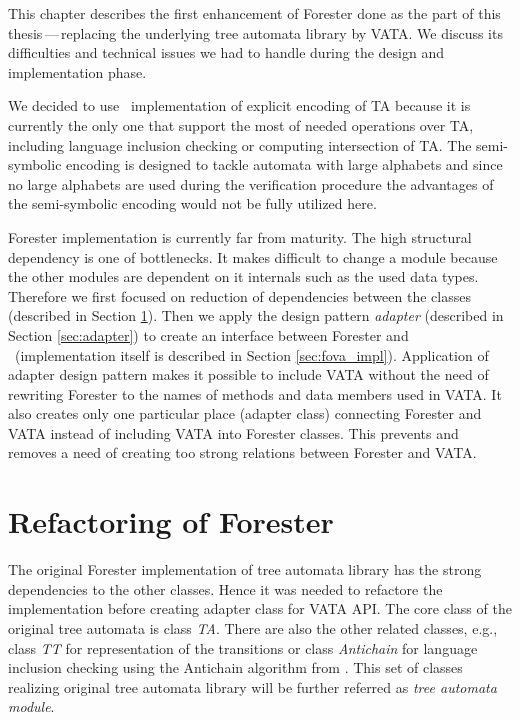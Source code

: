 This chapter describes the first enhancement of Forester done as the part of this thesis\,---\,replacing
the underlying tree automata library by VATA.
We discuss its difficulties and technical issues we had to handle during
the design and implementation phase.

We decided to use \vata\ implementation of explicit encoding of TA because
it is currently the only one that support the most of needed operations over TA,
including language inclusion checking or computing intersection of TA.
The semi-symbolic encoding is designed to tackle automata
with large alphabets
and since no large alphabets are used during the verification procedure
the advantages of the semi-symbolic encoding would not be fully utilized here.

Forester implementation is currently far from maturity.
The high structural dependency is one of bottlenecks.
It makes difficult to change a module because the other modules are
dependent on it internals such as the used data types.
Therefore we first focused on reduction of dependencies between the classes (described in Section \ref{sec:forester_prep}).
Then we apply the design pattern \emph{adapter} \cite{gamma95} (described in Section \ref{sec:adapter}) to create
an interface between Forester and \vata\ (implementation itself is described in Section \ref{sec:fova_impl}).
Application of adapter design pattern makes it possible to include VATA without the need of rewriting
Forester to the names of methods and data members used in VATA.
It also creates only one particular place (adapter class) connecting Forester and VATA instead of
including VATA into Forester classes.
This prevents and removes a need of creating too strong relations between Forester and VATA.

\section{Refactoring of Forester}
\label{sec:forester_prep}

The original Forester implementation of tree automata library
has the strong dependencies to the other classes.
Hence it was needed to refactore the implementation
before creating adapter class for VATA API.
The core class of the original tree automata is class \emph{TA}.
There are also the other related classes, e.g.,
class \emph{TT} for representation of the transitions
or class \emph{Antichain} for language inclusion checking
using the Antichain algorithm from \cite{tacas10}.
This set of classes realizing original tree automata library will be further referred as \emph{tree automata module}.

